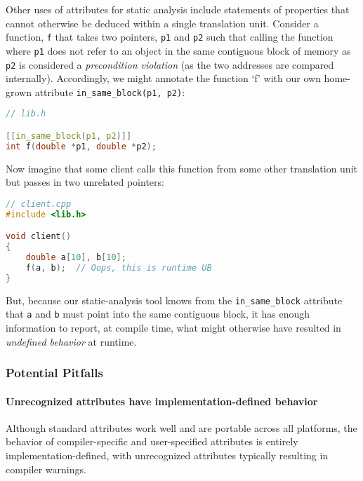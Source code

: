 \documentclass[twoside,10pt,letterpaper,usenames]{newstyle-PearsonGeneric-7-38}
\begin{document}
Other uses of attributes for static analysis include statements of
properties that cannot otherwise be deduced within a single translation
unit. Consider a function, \texttt{f} that takes two pointers,
\texttt{p1} and \texttt{p2} such that calling the function where
\texttt{p1} does not refer to an object in the same contiguous block of
memory as \texttt{p2} is considered a \emph{precondition violation} (as
the two addresses are compared internally). Accordingly, we might
annotate the function `f' with our own home-grown attribute
\texttt{in\_same\_block(p1, p2)}:

\begin{lstlisting}[language=C++, caption={missing caption}, label={testlabel}, frame=tb]
// lib.h

[[in_same_block(p1, p2)]]
int f(double *p1, double *p2);
\end{lstlisting}
    

Now imagine that some client calls this function from some other
translation unit but passes in two unrelated pointers:

\begin{lstlisting}[language=C++, caption={missing caption}, label={testlabel}, frame=tb]
// client.cpp
#include <lib.h>

void client()
{
    double a[10], b[10];
    f(a, b);  // Oops, this is runtime UB
}
\end{lstlisting}
    

But, because our static-analysis tool knows from the
\texttt{in\_same\_block} attribute that \texttt{a} and \texttt{b} must
point into the same contiguous block, it has enough information to
report, at compile time, what might otherwise have resulted in
\emph{undefined behavior} at runtime.

\subsubsection[Potential Pitfalls]{Potential Pitfalls}\label{potential-pitfalls}

\paragraph[Unrecognized attributes have implementation-defined behavior]{Unrecognized attributes have implementation-defined behavior}\label{unrecognized-attributes-have-implementation-defined-behavior}

Although standard attributes work well and are portable across all
platforms, the behavior of compiler-specific and user-specified
attributes is entirely implementation-defined, with unrecognized
attributes typically resulting in compiler warnings.
\end{document}
